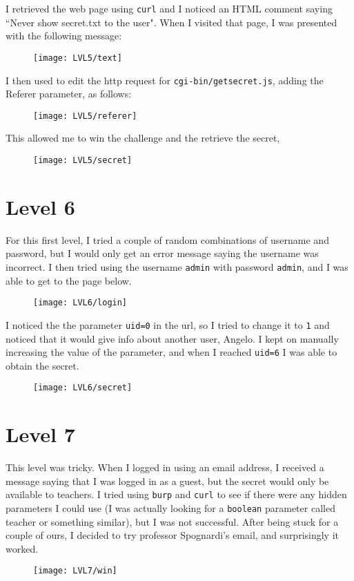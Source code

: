 \documentclass[12pt,a4paper]{article}
\begin{document}
	I retrieved the web page using \texttt{curl} and I noticed an HTML comment saying ``Never show secret.txt to the user". When I visited that page, I was presented with the following message:
	\begin{figure}[H]
		\centering
		\texttt{[image: LVL5/text]}
		\label{fig:comment5}
	\end{figure}
	I then used  to edit the http request for \texttt{cgi-bin/getsecret.js}, adding the Referer parameter, as follows:
	\begin{figure}[H]
		\centering
		\texttt{[image: LVL5/referer]}
		\label{fig:referer5}
	\end{figure}
	This allowed me to win the challenge and the retrieve the secret,
	\begin{figure}[H]
		\centering
		\texttt{[image: LVL5/secret]}
		\label{fig:secret5}
	\end{figure}


	\section*{Level 6}
	For this first level, I tried a couple of random combinations of username and password, but I would only get an error message saying the username was incorrect. I then tried using the username \texttt{admin} with password \texttt{admin}, and I was able to get to the page below.
	\begin{figure}[H]
		\centering
		\texttt{[image: LVL6/login]}
		\label{fig:login6}
	\end{figure}
	I noticed the the parameter \texttt{uid=0} in the url, so I tried to change it to \texttt{1} and noticed that it would give info about another user, Angelo. I kept on manually increasing the value of the parameter, and when I reached \texttt{uid=6} I was able to obtain the secret.
	\begin{figure}[H]
		\centering
		\texttt{[image: LVL6/secret]}
		\label{fig:secret6}
	\end{figure}


	\section*{Level 7}

	This level was tricky. When I logged in using an email address, I received a message saying that I was logged in as a guest, but the secret would only be available to teachers. I tried using \texttt{burp} and \texttt{curl} to see if there were any hidden parameters I could use (I was actually looking for a \texttt{boolean} parameter called teacher or something similar), but I was not successful. After being stuck for a couple of ours, I decided to try professor Spognardi's email, and surprisingly it worked.
	\begin{figure}[H]
		\centering
		\texttt{[image: LVL7/win]}
		\label{fig:win7}
	\end{figure}
\end{document}
